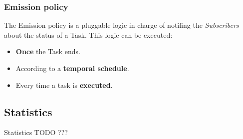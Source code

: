 \subsubsection{Emission policy}
The Emission policy is a pluggable logic in charge of notifing the
\emph{Subscribers} about the status of a Task. This logic can be executed:
\begin{itemize}
    \item \textbf{Once} the Task ends.

    \item According to a \textbf{temporal schedule}.

    \item Every time a task is \textbf{executed}.
\end{itemize}




\subsection{Statistics}
Statistics TODO ???